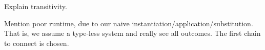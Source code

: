 \begin{TODO}
  \item Explain transitivity.
  \item Mention poor runtime, due to our naive instantiation/application/substitution.
        That is, we assume a type-less system and really see all outcomes.
        The first chain to connect is chosen.
\end{TODO}
